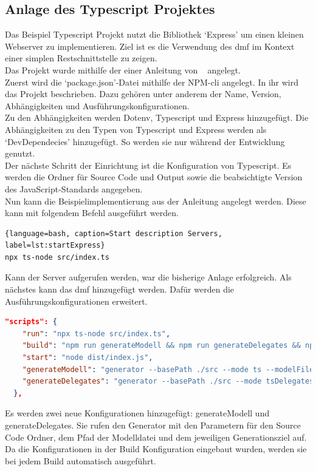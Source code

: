\documentclass[./einleitung.tex]{subfiles}
\begin{document}
    \subsection{Anlage des Typescript Projektes}\label{subsec:anlage-des-typescript-projektes}
    Das Beispiel Typescript Projekt nutzt die Bibliothek `Express' um einen kleinen Webserver zu implementieren.
    Ziel ist es die Verwendung des \acrshort{dmf} im Kontext einer simplen Restschnittstelle zu zeigen.\\
    Das Projekt wurde mithilfe der einer Anleitung von \citeauthor{initExpress}~\cite{initExpress} angelegt.\\
    Zuerst wird die `package.json'-Datei mithilfe der NPM-\acrshort{cli} angelegt.
    In ihr wird das Projekt beschrieben.
    Dazu gehören unter anderem der Name, Version, Abhängigkeiten und Ausführungskonfigurationen.\\
    Zu den Abhängigkeiten werden Dotenv, Typescript und Express hinzugefügt.
    Die Abhängigkeiten zu den Typen von Typescript und Express werden als `DevDependecies' hinzugefügt.
    So werden sie nur während der Entwicklung genutzt.\\
    Der nächste Schritt der Einrichtung ist die Konfiguration von Typescript.
    Es werden die Ordner für Source Code und Output sowie die beabsichtigte Version des JavaScript-Standards angegeben.\\
    Nun kann die Beispielimplementierung aus der Anleitung angelegt werden.
    Diese kann mit folgendem Befehl ausgeführt werden.
    \begin{lstlisting}{language=bash, caption=Start description Servers, label=lst:startExpress}
npx ts-node src/index.ts
    \end{lstlisting}
    Kann der Server aufgerufen werden, war die bisherige Anlage erfolgreich.
    Als nächstes kann das \acrshort{dmf} hinzugefügt werden.
    Dafür werden die Ausführungskonfigurationen erweitert.
    \begin{lstlisting}[language=json, caption=Ausführungskonfigurationen in package.json, label=lst:packageScripts]
"scripts": {
    "run": "npx ts-node src/index.ts",
    "build": "npm run generateModell && npm run generateDelegates && npx tsc",
    "start": "node dist/index.js",
    "generateModell": "generator --basePath ./src --mode ts --modelFile ../Modell/domain.dmf",
    "generateDelegates": "generator --basePath ./src --mode tsDelegates --modelFile ../Modell/domain.dmf",
  },
    \end{lstlisting}
    Es werden zwei neue Konfigurationen hinzugefügt: generateModell und generateDelegates.
    Sie rufen den Generator mit den Parametern für den Source Code Ordner, dem Pfad der Modelldatei und dem jeweiligen Generationsziel auf.
    Da die Konfigurationen in der Build Konfiguration eingebaut wurden, werden sie bei jedem Build automatisch ausgeführt.
\end{document}
